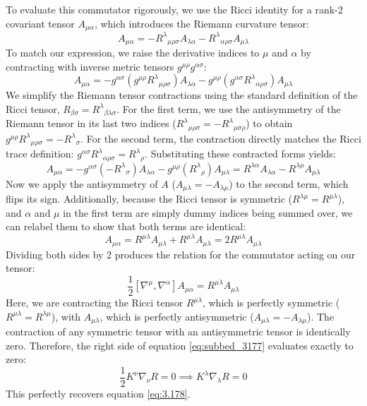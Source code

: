 \documentclass[11pt, a4paper]{report}
\begin{document}
To evaluate this commutator rigorously, we use the Ricci identity for a rank-2 covariant tensor $A_{\mu\alpha}$, which introduces the Riemann curvature tensor:
\begin{equation} [\nabla_\rho, \nabla_\sigma] A_{\mu\alpha} = -R^\lambda{}_{\mu\rho\sigma} A_{\lambda\alpha} - R^\lambda{}_{\alpha\rho\sigma} A_{\mu\lambda} \end{equation}
To match our expression, we raise the derivative indices to $\mu$ and $\alpha$ by contracting with inverse metric tensors $g^{\mu\rho} g^{\alpha\sigma}$:
\begin{equation} [\nabla^\mu, \nabla^\alpha] A_{\mu\alpha} = -g^{\alpha\sigma} (g^{\mu\rho} R^\lambda{}_{\mu\rho\sigma}) A_{\lambda\alpha} - g^{\mu\rho} (g^{\alpha\sigma} R^\lambda{}_{\alpha\rho\sigma}) A_{\mu\lambda} \end{equation}
We simplify the Riemann tensor contractions using the standard definition of the Ricci tensor, $R_{\beta\sigma} = R^\lambda{}_{\beta\lambda\sigma}$. For the first term, we use the antisymmetry of the Riemann tensor in its last two indices ($R^\lambda{}_{\mu\rho\sigma} = -R^\lambda{}_{\mu\sigma\rho}$) to obtain $g^{\mu\rho} R^\lambda{}_{\mu\rho\sigma} = -R^\lambda{}_\sigma$. For the second term, the contraction directly matches the Ricci trace definition: $g^{\alpha\sigma} R^\lambda{}_{\alpha\rho\sigma} = R^\lambda{}_\rho$. Substituting these contracted forms yields:
\begin{equation} [\nabla^\mu, \nabla^\alpha] A_{\mu\alpha} = -g^{\alpha\sigma} (-R^\lambda{}_\sigma) A_{\lambda\alpha} - g^{\mu\rho} (R^\lambda{}_\rho) A_{\mu\lambda} = R^{\lambda\alpha} A_{\lambda\alpha} - R^{\lambda\mu} A_{\mu\lambda} \end{equation}
Now we apply the antisymmetry of $A$ ($A_{\mu\lambda} = -A_{\lambda\mu}$) to the second term, which flips its sign. Additionally, because the Ricci tensor is symmetric ($R^{\lambda\mu} = R^{\mu\lambda}$), and $\alpha$ and $\mu$ in the first term are simply dummy indices being summed over, we can relabel them to show that both terms are identical:
\begin{equation} [\nabla^\mu, \nabla^\alpha] A_{\mu\alpha} = R^{\mu\lambda} A_{\mu\lambda} + R^{\mu\lambda} A_{\mu\lambda} = 2 R^{\mu\lambda} A_{\mu\lambda} \end{equation}
Dividing both sides by 2 produces the relation for the commutator acting on our tensor:
\begin{equation} \frac{1}{2} [\nabla^\mu, \nabla^\alpha] A_{\mu\alpha} = R^{\mu\lambda} A_{\mu\lambda} \end{equation}
Here, we are contracting the Ricci tensor $R^{\mu\lambda}$, which is perfectly symmetric ($R^{\mu\lambda} = R^{\lambda\mu}$), with $A_{\mu\lambda}$, which is perfectly antisymmetric ($A_{\mu\lambda} = -A_{\lambda\mu}$). The contraction of any symmetric tensor with an antisymmetric tensor is identically zero. Therefore, the right side of equation \eqref{eq:subbed_3177} evaluates exactly to zero:
\begin{equation} \frac{1}{2} K^\nu \nabla_\nu R = 0 \implies K^\lambda \nabla_\lambda R = 0 \label{eq:3.178} \end{equation}
This perfectly recovers equation \eqref{eq:3.178}. 
\end{document}
